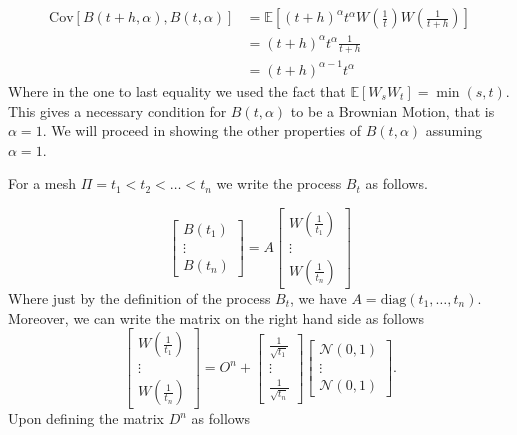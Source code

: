 \documentclass[a4paper,12pt]{article} %
\newcommand{\Cov}{\mathrm{Cov}}
\begin{document}
\begin{align*}
    \Cov\left[B(t+h, \alpha ), B(t, \alpha ) \right] & = \mathbb{E} \left[ (t+h)^{\alpha} t^{\alpha} W\left( \frac{1}{t} \right) W\left( \frac{1}{t+h} \right) \right] \\
                                                     & = (t+h)^{\alpha } t^{\alpha } \frac{1}{t+h}                                                                     \\
                                                     & = (t+h)^{\alpha -1} t^{\alpha }
\end{align*}
Where in the one to last equality we used the fact that \(\mathbb{E} \left[ W_s W_t \right]= \min (s,t)\).
This gives a necessary condition for \(B(t, \alpha )\) to be a Brownian Motion, that is \(\alpha =1\).
We will proceed in showing the other properties of \(B(t, \alpha )\) assuming \(\alpha =1\).

For a mesh \(\Pi  = t_1 <t_2<\dots <t_n\) we write the process \(B_t\) as follows.

\begin{equation}
    \begin{bmatrix}
        B(t_1) \\
        \vdots \\
        B(t_n)
    \end{bmatrix}
    = A
    \begin{bmatrix}
        W\left( \frac{1}{t_1} \right) \\
        \vdots                        \\
        W\left( \frac{1}{t_n} \right)
    \end{bmatrix}
\end{equation}
Where just by the definition of the process \(B_t\), we have \(A = \mathrm{diag} (t_1, \dots ,t_n)\).
Moreover, we can write the matrix on the right hand side as follows
\begin{equation}
    \begin{bmatrix}
        W\left( \frac{1}{t_1} \right) \\
        \vdots                        \\
        W\left( \frac{1}{t_n} \right)
    \end{bmatrix}
    = O^n +
    \begin{bmatrix}
        \frac{1}{\sqrt{t_1}} \\
        \vdots               \\
        \frac{1}{\sqrt{t_n}}
    \end{bmatrix}
    \begin{bmatrix}
        \mathcal{N}(0, 1) \\
        \vdots            \\
        \mathcal{N}(0, 1)
    \end{bmatrix}.
\end{equation}
Upon defining the matrix \(D^n \) as follows
\end{document}
